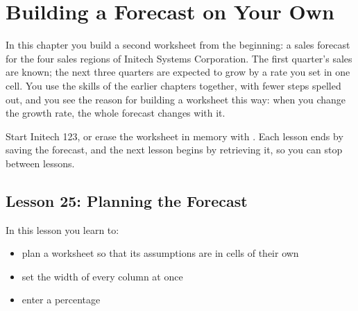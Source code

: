 \chapter{Building a Forecast on Your Own}

In this chapter you build a second worksheet from the beginning: a sales
forecast for the four sales regions of Initech Systems Corporation.  The
first quarter's sales are known; the next three quarters are expected to
grow by a rate you set in one cell.  You use the skills of the earlier
chapters together, with fewer steps spelled out, and you see the reason
for building a worksheet this way: when you change the growth rate, the
whole forecast changes with it.

Start Initech 123, or erase the worksheet in memory with
.  Each lesson ends by saving the forecast,
and the next lesson begins by retrieving it, so you can stop between
lessons.


\section{Lesson 25: Planning the Forecast}
In this lesson you learn to:
\begin{itemize}
\item plan a worksheet so that its assumptions are in cells of their own
\item set the width of every column at once
\item enter a percentage
\end{itemize}

